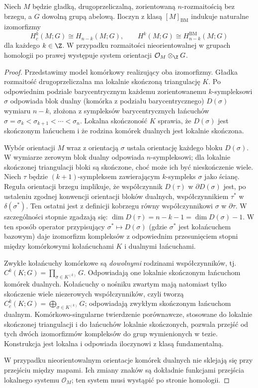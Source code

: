 \begin{twierdzenie}
\label{thm:noncompact-PD-v11}
Niech $M$ będzie gładką, drugoprzeliczalną,
zorientowaną $n$-rozmaitością bez brzegu,
a $G$ dowolną grupą abelową. Iloczyn z klasą
$[M]_{\mathrm{BM}}$ indukuje naturalne izomorfizmy
\[
H_c^k(M;G)\cong H_{n-k}(M;G),\qquad
H^k(M;G)\cong H_{n-k}^{\mathrm{BM}}(M;G)
\]
dla każdego $k\in\Z$. W przypadku rozmaitości
nieorientowalnej w grupach homologii po prawej
występuje system orientacji $\mathcal O_M\otimes_{\Z}G$.
\end{twierdzenie}
\begin{proof}
Przedstawimy model komórkowy realizujący oba izomorfizmy.
Gładka rozmaitość drugoprzeliczalna ma lokalnie skończoną
triangulację $K$. Po odpowiednim podziale barycentrycznym
każdemu zorientowanemu $k$-sympleksowi $\sigma$ odpowiada
blok dualny (komórka z podziału barycentrycznego) $D(\sigma)$ wymiaru $n-k$, złożona z
sympleksów barycentrycznych łańcuchów
$\sigma=\sigma_k<\sigma_{k+1}<\cdots<\sigma_n$.
Lokalna skończoność $K$ sprawia, że $D(\sigma)$ jest
skończonym łańcuchem i że rodzina komórek dualnych
jest lokalnie skończona.

Wybór orientacji $M$ wraz z orientacją $\sigma$
ustala orientację każdego bloku $D(\sigma)$.
W wymiarze zerowym blok dualny odpowiada
$n$-sympleksowi; dla lokalnie skończonej triangulacji
bloki są skończone, choć może ich być nieskończenie wiele.
Niech $\tau$ będzie $(k+1)$-sympleksem zawierającym
$k$-sympleks $\sigma$ jako ścianę.
Reguła orientacji brzegu implikuje, że współczynnik
$D(\tau)$ w $\partial D(\sigma)$ jest, po ustaleniu
zgodnej konwencji orientacji bloków dualnych,
współczynnikiem $\tau^*$ w $\delta(\sigma^*)$.
Ten ostatni jest z definicji kobrzegu równy
współczynnikowi $\sigma$ w $\partial\tau$.
W szczególności stopnie zgadzają się:
$\dim D(\tau)=n-k-1=\dim D(\sigma)-1$.
W ten sposób operator przypisujący
$\sigma^*\mapsto D(\sigma)$ (gdzie $\sigma^*$ jest
kołańcuchem bazowym) daje izomorfizm kompleksów
z odpowiednim przesunięciem stopni między
komórkowymi kołańcuchami $K$ i dualnymi łańcuchami.

Zwykłe kołańcuchy komórkowe są \emph{dowolnymi}
rodzinami współczynników, tj.
$C^k(K;G)=\prod_{\sigma\in K^{(k)}}G$.
Odpowiadają one lokalnie skończonym łańcuchom
komórek dualnych. Kołańcuchy o nośniku zwartym
mają natomiast tylko skończenie wiele niezerowych
współczynników, czyli tworzą
$C_c^k(K;G)=\bigoplus_{\sigma\in K^{(k)}}G$;
odpowiadają zwykłym skończonym łańcuchom dualnym.
Komórkowo-singularne twierdzenie porównawcze,
stosowane do lokalnie skończonej triangulacji
i do łańcuchów lokalnie skończonych, pozwala
przejść od tych dwóch izomorfizmów kompleksów
do grup wymienionych w tezie. Konstrukcja jest
lokalna i odpowiada iloczynowi z klasą fundamentalną.

W przypadku nieorientowalnym orientacje komórek dualnych
nie sklejają się przy przejściu między mapami.
Ich zmiany znaków są dokładnie funkcjami przejścia
lokalnego systemu $\mathcal O_M$; ten system
musi wystąpić po stronie homologii.
\end{proof}

